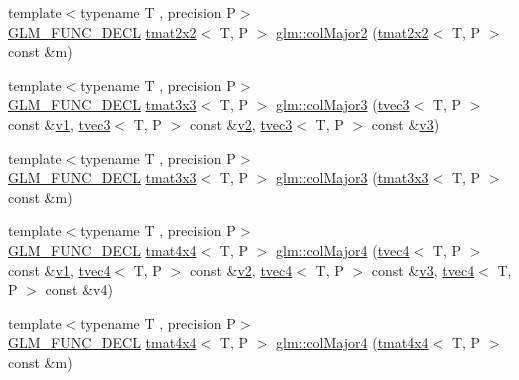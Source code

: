 \begin{DoxyCompactItemize}
{\footnotesize template$<$typename T , precision P$>$ }\\\mbox{\hyperlink{setup_8hpp_ab2d052de21a70539923e9bcbf6e83a51}{G\+L\+M\+\_\+\+F\+U\+N\+C\+\_\+\+D\+E\+CL}} \mbox{\hyperlink{structglm_1_1tmat2x2}{tmat2x2}}$<$ T, P $>$ \mbox{\hyperlink{group__gtx__matrix__major__storage_ga5cfd25de9d5b4c6a825085f38ddfeff7}{glm\+::col\+Major2}} (\mbox{\hyperlink{structglm_1_1tmat2x2}{tmat2x2}}$<$ T, P $>$ const \&m)
\item 
{\footnotesize template$<$typename T , precision P$>$ }\\\mbox{\hyperlink{setup_8hpp_ab2d052de21a70539923e9bcbf6e83a51}{G\+L\+M\+\_\+\+F\+U\+N\+C\+\_\+\+D\+E\+CL}} \mbox{\hyperlink{structglm_1_1tmat3x3}{tmat3x3}}$<$ T, P $>$ \mbox{\hyperlink{group__gtx__matrix__major__storage_ga3a55e2948193e91733e434e7cc3c1540}{glm\+::col\+Major3}} (\mbox{\hyperlink{structglm_1_1tvec3}{tvec3}}$<$ T, P $>$ const \&\mbox{\hyperlink{glad_8h_a0779c3b73f9aa3a0ac5b0139b5d291d9}{v1}}, \mbox{\hyperlink{structglm_1_1tvec3}{tvec3}}$<$ T, P $>$ const \&\mbox{\hyperlink{glad_8h_a9a09a1837922b2b806f4589096a52049}{v2}}, \mbox{\hyperlink{structglm_1_1tvec3}{tvec3}}$<$ T, P $>$ const \&\mbox{\hyperlink{glad_8h_acc806b31cbf466ceba6555983d8b814d}{v3}})
\item 
{\footnotesize template$<$typename T , precision P$>$ }\\\mbox{\hyperlink{setup_8hpp_ab2d052de21a70539923e9bcbf6e83a51}{G\+L\+M\+\_\+\+F\+U\+N\+C\+\_\+\+D\+E\+CL}} \mbox{\hyperlink{structglm_1_1tmat3x3}{tmat3x3}}$<$ T, P $>$ \mbox{\hyperlink{group__gtx__matrix__major__storage_gaa93f3dcc47ced18e5db4a853363d9386}{glm\+::col\+Major3}} (\mbox{\hyperlink{structglm_1_1tmat3x3}{tmat3x3}}$<$ T, P $>$ const \&m)
\item 
{\footnotesize template$<$typename T , precision P$>$ }\\\mbox{\hyperlink{setup_8hpp_ab2d052de21a70539923e9bcbf6e83a51}{G\+L\+M\+\_\+\+F\+U\+N\+C\+\_\+\+D\+E\+CL}} \mbox{\hyperlink{structglm_1_1tmat4x4}{tmat4x4}}$<$ T, P $>$ \mbox{\hyperlink{group__gtx__matrix__major__storage_ga2829de096bb67ab5cd670958f3d402b6}{glm\+::col\+Major4}} (\mbox{\hyperlink{structglm_1_1tvec4}{tvec4}}$<$ T, P $>$ const \&\mbox{\hyperlink{glad_8h_a0779c3b73f9aa3a0ac5b0139b5d291d9}{v1}}, \mbox{\hyperlink{structglm_1_1tvec4}{tvec4}}$<$ T, P $>$ const \&\mbox{\hyperlink{glad_8h_a9a09a1837922b2b806f4589096a52049}{v2}}, \mbox{\hyperlink{structglm_1_1tvec4}{tvec4}}$<$ T, P $>$ const \&\mbox{\hyperlink{glad_8h_acc806b31cbf466ceba6555983d8b814d}{v3}}, \mbox{\hyperlink{structglm_1_1tvec4}{tvec4}}$<$ T, P $>$ const \&v4)
\item 
{\footnotesize template$<$typename T , precision P$>$ }\\\mbox{\hyperlink{setup_8hpp_ab2d052de21a70539923e9bcbf6e83a51}{G\+L\+M\+\_\+\+F\+U\+N\+C\+\_\+\+D\+E\+CL}} \mbox{\hyperlink{structglm_1_1tmat4x4}{tmat4x4}}$<$ T, P $>$ \mbox{\hyperlink{group__gtx__matrix__major__storage_ga7592acfd27da055e2d7c39564cf8803d}{glm\+::col\+Major4}} (\mbox{\hyperlink{structglm_1_1tmat4x4}{tmat4x4}}$<$ T, P $>$ const \&m)
\end{DoxyCompactItemize}


